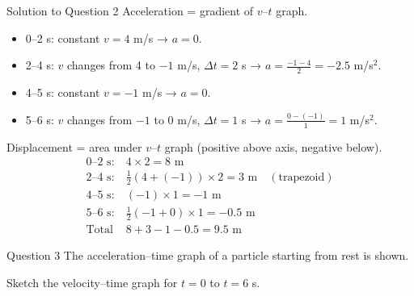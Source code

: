 \documentclass{beamer}
\begin{document}
\begin{frame}[shrink=15]{Solution to Question 2}
Acceleration = gradient of $v$–$t$ graph.
\begin{itemize}
    \item 0–2 s: constant $v=4$ m/s → $a=0$.
    \item 2–4 s: $v$ changes from 4 to $-1$ m/s, $\Delta t=2$ s → $a = \frac{-1-4}{2} = -2.5$ m/s$^2$.
    \item 4–5 s: constant $v=-1$ m/s → $a=0$.
    \item 5–6 s: $v$ changes from $-1$ to 0 m/s, $\Delta t=1$ s → $a = \frac{0-(-1)}{1} = 1$ m/s$^2$.
\end{itemize}
Displacement = area under $v$–$t$ graph (positive above axis, negative below).
\begin{align*}
\text{0–2 s:} & \ 4\times2 = 8 \text{ m} \\
\text{2–4 s:} & \ \frac{1}{2}(4+(-1))\times2 = 3 \text{ m} \quad (\text{trapezoid}) \\
\text{4–5 s:} & \ (-1)\times1 = -1 \text{ m} \\
\text{5–6 s:} & \ \frac{1}{2}(-1+0)\times1 = -0.5 \text{ m} \\
\text{Total} & \ 8+3-1-0.5 = 9.5 \text{ m}
\end{align*}
\end{frame}

\begin{frame}[shrink=15]{Question 3}
The acceleration–time graph of a particle starting from rest is shown.
\begin{center}
\end{center}
Sketch the velocity–time graph for $t=0$ to $t=6$ s.
\end{frame}
\end{document}
